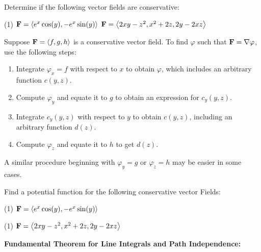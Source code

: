 \documentclass[mathNotesPreamble]{subfiles}
\begin{document}
  \begin{ex*}
    Determine if the following vector fields are conservative:
  \end{ex*}
  \begin{tasks}[after-item-skip=\stretch{1}, label=](1)
    \task $\mathbf F={\left\langle e^x\cos(y),-e^x\sin(y) \right\rangle}$
    \task $\mathbf F={\left\langle 2xy-z^2, x^2+2z, 2y-2xz \right\rangle}$
  \end{tasks}
  \pagebreak

  \begin{thmBox*}
    Suppose $\mathbf F={\left\langle f,g,h \right\rangle}$ is a conservative vector field. To find $\varphi$ such that $\mathbf F=\nabla \varphi$, use the following steps:
    \begin{enumerate}
      \item 
        Integrate $\varphi_x=f$ with respect to $x$ to obtain $\varphi$, which includes an arbitrary function $c(y,z)$.
      \item 
        Compute $\varphi_y$ and equate it to $g$ to obtain an expression for $c_y(y,z)$.
      \item 
        Integrate $c_y(y,z)$ with respect to $y$ to obtain $c(y,z)$, including an arbitrary function $d(z)$.
      \item 
        Compute $\varphi_z$ and equate it to $h$ to get $d(z)$.
    \end{enumerate}
    A similar procedure beginning with $\varphi_y=g$ or $\varphi_z=h$ may be easier in some cases.
  \end{thmBox*}

  \begin{ex*}
    Find a potential function for the following conservative vector Fields:
  \end{ex*}
  \begin{tasks}[after-item-skip=\stretch{1}, label=](1)
    \task $\mathbf F={\left\langle e^x\cos(y),-e^x\sin(y) \right\rangle}$
  \end{tasks}
  \pagebreak

  \begin{tasks}[after-item-skip=\stretch{1}, label=](1)
    \task $\mathbf F={\left\langle 2xy-z^2, x^2+2z, 2y-2xz \right\rangle}$
  \end{tasks}
  \pagebreak

  \noindent\textbf{Fundamental Theorem for Line Integrals and Path Independence:}
\end{document}
